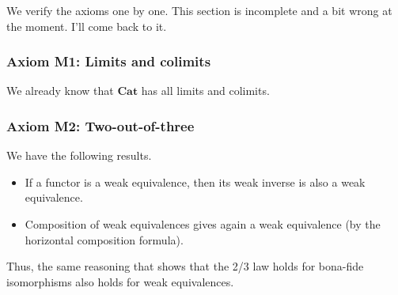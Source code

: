 \documentclass[main.tex]{subfiles}
\begin{document}
We verify the axioms one by one. This section is incomplete and a bit wrong at the moment. I'll come back to it.
\subsubsection{Axiom M1: Limits and colimits}

We already know that $\mathbf{Cat}$ has all limits and colimits.

\subsubsection{Axiom M2: Two-out-of-three}

We have the following results.
\begin{itemize}
  \item If a functor is a weak equivalence, then its weak inverse is also a weak equivalence.

  \item Composition of weak equivalences gives again a weak equivalence (by the horizontal composition formula).
\end{itemize}
Thus, the same reasoning that shows that the 2/3 law holds for bona-fide isomorphisms also holds for weak equivalences.
\end{document}
